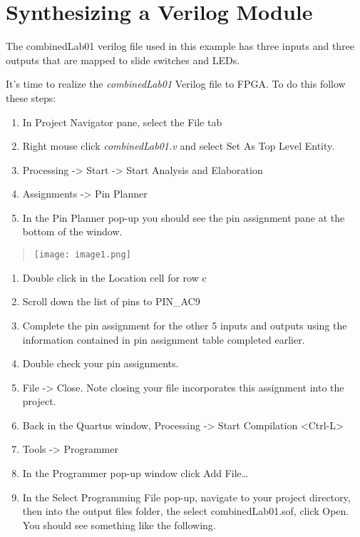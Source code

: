\chapter{Synthesizing a Verilog Module}
\graphicspath{ {./Lab00HowTo/howTo40 Performing Synthesis/Fig} }

The combinedLab01 verilog file used in this example has three inputs and
three outputs that are mapped to slide switches and LEDs.

It's time to realize the \emph{combinedLab01} Verilog file to FPGA. To
do this follow these steps:

\begin{enumerate}
\def\labelenumi{\arabic{enumi}.}
\item
  In Project Navigator pane, select the File tab
\item
  Right mouse click \emph{combinedLab01.v} and select Set As Top Level
  Entity.
\item
  Processing -\textgreater{} Start -\textgreater{} Start Analysis and
  Elaboration
\item
  Assignments -\textgreater{} Pin Planner
\item
  In the Pin Planner pop-up you should see the pin assignment pane at
  the bottom of the window.
\end{enumerate}

\begin{quote}
\texttt{[image: image1.png]}
\end{quote}

\begin{enumerate}
\def\labelenumi{\arabic{enumi}.}
\setcounter{enumi}{5}
\item
  Double click in the Location cell for row c
\item
  Scroll down the list of pins to PIN\_AC9
\item
  Complete the pin assignment for the other 5 inputs and outputs using
  the information contained in pin assignment table completed earlier.
\item
  Double check your pin assignments.
\item
  File -\textgreater{} Close. Note closing your file incorporates this
  assignment into the project.
\item
  Back in the Quartus window, Processing -\textgreater{} Start
  Compilation \textless Ctrl-L\textgreater{}
\item
  Tools -\textgreater{} Programmer
\item
  In the Programmer pop-up window click Add File\ldots{}
\item
  In the Select Programming File pop-up, navigate to your project
  directory, then into the output files folder, the select
  combinedLab01.sof, click Open. You should see something like the
  following.
\end{enumerate}


